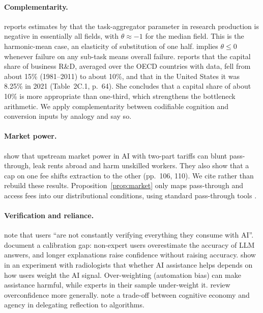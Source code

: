 \documentclass[12pt]{article}
\theoremstyle{remark}
\begin{document}
\paragraph{Complementarity.} \citet[p.~55]{jones2026rd} reports estimates by \citet{ahmadpoor2019decoding} that the task-aggregator parameter in research production is negative in essentially all fields, with $\theta\approx-1$ for the median field. This is the harmonic-mean case, an elasticity of substitution of one half. \citet{kremer1993oring} implies $\theta\le0$ whenever failure on any sub-task means overall failure. \citet[pp.~63--64]{hall2026comment} reports that the capital share of business R\&D, averaged over the OECD countries with data, fell from about 15\% (1981--2011) to about 10\%, and that in the United States it was 8.25\% in 2021 (Table~2C.1, p.~64). She concludes that a capital share of about 10\% is more appropriate than one-third, which strengthens the bottleneck arithmetic. We apply complementarity between codifiable cognition and conversion inputs by analogy and say so.

\paragraph{Market power.} \citet{athey2026competition} show that upstream market power in AI with two-part tariffs can blunt pass-through, leak rents abroad and harm unskilled workers. They also show that a cap on one fee shifts extraction to the other (pp.~106, 110). We cite rather than rebuild these results. Proposition~\ref{prop:market} only maps pass-through and access fees into our distributional conditions, using standard pass-through tools \citep{weyl2013passthrough}.

\paragraph{Verification and reliance.} \citet[p.~383]{stiglitz2026information} note that users ``are not constantly verifying everything they consume with AI''. \citet{steyvers2025know} document a calibration gap: non-expert users overestimate the accuracy of LLM answers, and longer explanations raise confidence without raising accuracy. \citet{agarwal2023radiology} show in an experiment with radiologists that whether AI assistance helps depends on how users weight the AI signal. Over-weighting (automation bias) can make assistance harmful, while experts in their sample under-weight it. \citet{moore2008overconfidence} review overconfidence more generally. \citet[p.~277, fn.~6]{ludwig2026reflective} note a trade-off between cognitive economy and agency in delegating reflection to algorithms.
\end{document}
